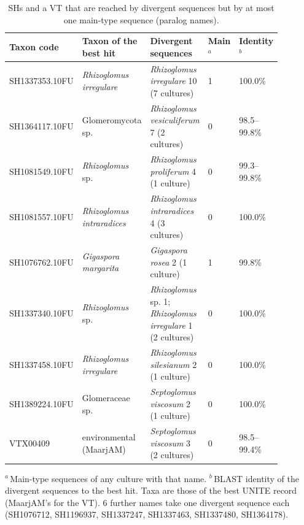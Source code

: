 \begin{table}[htbp]\centering
\begin{threeparttable}
\caption{SHs and a VT that are reached by divergent sequences but by at most one main-type sequence (paralog names).}
\label{tab:paralog}
\footnotesize\setlength{\tabcolsep}{4pt}
\begin{tabular}{L{0.165\linewidth}L{0.20\linewidth}L{0.325\linewidth}L{0.06\linewidth}L{0.13\linewidth}}
\toprule
Taxon code & Taxon of the best hit & Divergent sequences & Main$^{a}$ & Identity$^{b}$\\
\midrule
SH1337353.10FU & \emph{Rhizoglomus irregulare} & \emph{Rhizoglomus irregulare} 10 (7 cultures) & 1 & 100.0\%\\
SH1364117.10FU & Glomeromycota sp. & \emph{Rhizoglomus vesiculiferum} 7 (2 cultures) & 0 & 98.5--99.8\%\\
SH1081549.10FU & \emph{Rhizoglomus} sp. & \emph{Rhizoglomus proliferum} 4 (1 culture) & 0 & 99.3--99.8\%\\
SH1081557.10FU & \emph{Rhizoglomus intraradices} & \emph{Rhizoglomus intraradices} 4 (3 cultures) & 0 & 100.0\%\\
SH1076762.10FU & \emph{Gigaspora margarita} & \emph{Gigaspora rosea} 2 (1 culture) & 1 & 99.8\%\\
SH1337340.10FU & \emph{Rhizoglomus} sp. & \emph{Rhizoglomus} sp. 1; \emph{Rhizoglomus irregulare} 1 (2 cultures) & 0 & 100.0\%\\
SH1337458.10FU & \emph{Rhizoglomus irregulare} & \emph{Rhizoglomus silesianum} 2 (1 culture) & 0 & 100.0\%\\
SH1389224.10FU & Glomeraceae sp. & \emph{Septoglomus viscosum} 2 (1 culture) & 0 & 100.0\%\\
VTX00409 & environmental (MaarjAM) & \emph{Septoglomus viscosum} 3 (2 cultures) & 0 & 98.5--99.4\%\\
\bottomrule
\end{tabular}
\begin{tablenotes}\footnotesize
\item $^{a}$\,Main-type sequences of any culture with that name. $^{b}$\,BLAST identity of the divergent sequences to the best hit. Taxa are those of the best UNITE record (MaarjAM's for the VT). 6 further names take one divergent
sequence each (SH1076712, SH1196937, SH1337247, SH1337463, SH1337480, SH1364178). 
\end{tablenotes}
\end{threeparttable}
\end{table}
